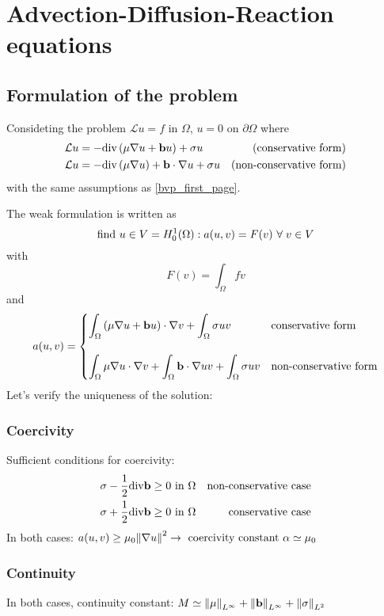 \newpage
\section{Advection-Diffusion-Reaction equations}
\subsection{Formulation of the problem}
Consideting the problem \(\mathcal{L}u = f\) in \(\Omega\), \(u=0\) on \(\partial\Omega\) where 
\begin{align*}
    &\mathcal{L} u = -\text{div} \left(\mu \nabla u + \textbf{b} u\right) + \sigma u & \text{(conservative form)} \\
    &\mathcal{L} u = -\text{div} \left(\mu \nabla u\right) + \textbf{b} \cdot \nabla u + \sigma u & \text{(non-conservative form)}
\end{align*}
with the same assumptions as \eqref{bvp_first_page}. 

The weak formulation is written as 
\begin{equation}
    \text{find } u \in V = H^1_0(\Omega) : a(u,v) = F(v) \ \forall \; v \in V
    \label{weak_formulation_adr}
\end{equation}
with 
\[
    F(v) = \int_\Omega fv
\]
and 
\[
    a(u,v) = \begin{cases}
        \displaystyle\int_\Omega \left( \mu \nabla u + \textbf{b} u \right) \cdot \nabla v + \int_\Omega \sigma u v & \text{conservative form} \\
        \\
        \displaystyle\int_\Omega \mu \nabla u \cdot \nabla v + \int_\Omega \textbf{b} \cdot \nabla u v + \int_\Omega \sigma u v & \text{non-conservative form}
    \end{cases}
\]
Let's verify the uniqueness of the solution:
\subsubsection*{Coercivity}
Sufficient conditions for coercivity:
\begin{align*}
    &\sigma - \frac{1}{2} \text{div} \textbf{b} \geq 0 \text{ in } \Omega & \text{non-conservative case} \\
    &\sigma + \frac{1}{2} \text{div} \textbf{b} \geq 0 \text{ in } \Omega & \text{conservative case}  
\end{align*}
In both cases: \(a(u,v) \geq \mu_0\norm{\nabla u}^2 \rightarrow \text{ coercivity constant } \alpha \simeq \mu_0\)
\subsubsection*{Continuity}
In both cases, continuity constant: \(M \simeq \norm{\mu}_{L^\infty} + \norm{\textbf{b}}_{L^\infty} + \norm{\sigma}_{L^2}\)


